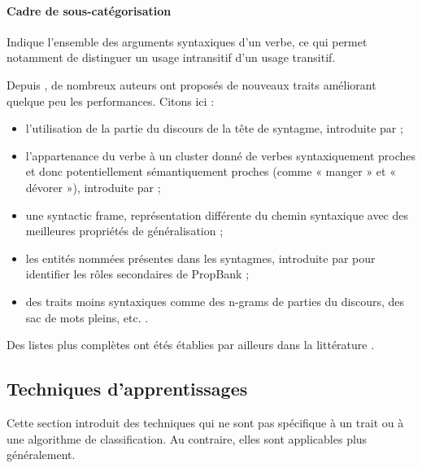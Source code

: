\paragraph{Cadre de sous-catégorisation} Indique l'ensemble des arguments
syntaxiques d'un verbe, ce qui permet notamment de distinguer un usage
intransitif d'un usage transitif.

Depuis \cite{gildea2002automatic}, de nombreux auteurs ont proposés de nouveaux
traits améliorant quelque peu les performances. Citons ici :

\begin{itemize}

    \item l'utilisation de la partie du discours de la tête de syntagme,
        introduite par \cite{surdeanu2003using} ;

    \item l'appartenance du verbe à un cluster donné de verbes syntaxiquement
        proches et donc potentiellement sémantiquement proches (comme « manger
        » et « dévorer »), introduite par \cite{pradhan2004shallow} ;

    \item une {syntactic frame}, représentation différente du chemin syntaxique
        avec des meilleures propriétés de généralisation
        \citep{xue2004calibrating} ;

    \item les entités nommées présentes dans les syntagmes, introduite par
        \cite{pradhan2005semantic} pour identifier les rôles secondaires de
        PropBank ;

    \item des traits moins syntaxiques comme des n-grams de parties du
        discours, des sac de mots pleins, etc. \citep{surdeanu2007combination}.

\end{itemize}

Des listes plus complètes ont étés établies par ailleurs dans la littérature
\citep{pradhan2005semantic,marquez2008semantic,palmer2010semantic}.

\subsection{Techniques d'apprentissages}

Cette section introduit des techniques qui ne sont pas spécifique à un trait ou
à une algorithme de classification. Au contraire, elles sont applicables plus
généralement.

